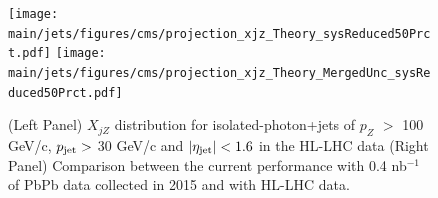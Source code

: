 \begin{figure}[!ht]
\begin{center}
\texttt{[image: \\main/jets/figures/cms/projection\_xjz\_Theory\_sysReduced50Prct.pdf]}
\texttt{[image: \\main/jets/figures/cms/projection\_xjz\_Theory\_MergedUnc\_sysReduced50Prct.pdf]}
\caption{(Left Panel) $X_{jZ}$ distribution for isolated-photon+jets of $p_{Z}$ $> $ 100 GeV/c, $p_{\rm jet} > $ 30 GeV/c and $|\eta_{\rm jet}| < 1.6$ in the HL-LHC data (Right Panel) Comparison between the current performance with 0.4 nb$^{-1}$ of PbPb data collected in 2015 and with HL-LHC data. \cite{CMS-FTR-17-002:2017dec}}
\label{fig:Zjet}
\end{center}
\end{figure}
